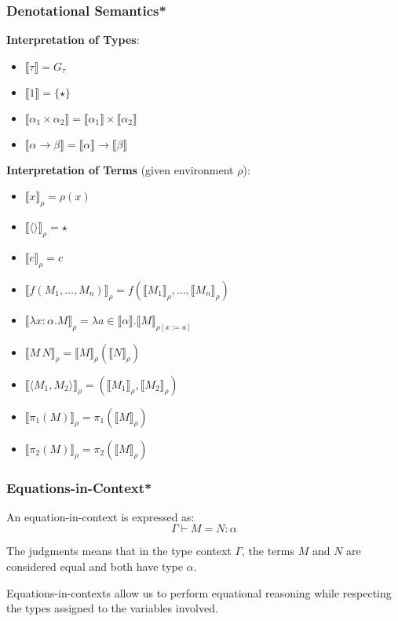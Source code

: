 \documentclass[aspectratio=169]{beamer}
\begin{document}
\begin{frame}
\frametitle{Denotational Semantics*}

\textbf{Interpretation of Types}:

\begin{itemize}
    \item $\llbracket \tau \rrbracket = G_\tau$
    \item $\llbracket 1 \rrbracket = \{\star\}$
    \item $\llbracket \alpha_1 \times \alpha_2 \rrbracket = \llbracket \alpha_1 \rrbracket \times \llbracket \alpha_2 \rrbracket$
    \item $\llbracket \alpha \rightarrow \beta \rrbracket = \llbracket \alpha \rrbracket \rightarrow \llbracket \beta \rrbracket$
\end{itemize}

\textbf{Interpretation of Terms} (given environment $\rho$):
\begin{itemize}
    \item $\llbracket x \rrbracket_\rho = \rho(x)$
    \item $\llbracket \langle \rangle \rrbracket_\rho = \star$
    \item $\llbracket c \rrbracket_\rho = c$
    \item $\llbracket f(M_1, \ldots, M_n) \rrbracket_\rho = f(\llbracket M_1 \rrbracket_\rho, \ldots, \llbracket M_n \rrbracket_\rho)$
    \item $\llbracket \lambda x : \alpha. M \rrbracket_\rho = \lambda a \in \llbracket \alpha \rrbracket. \llbracket M \rrbracket_{\rho[x := a]}$
    \item $\llbracket M \, N \rrbracket_\rho = \llbracket M \rrbracket_\rho (\llbracket N \rrbracket_\rho)$
    \item $\llbracket \langle M_1, M_2 \rangle \rrbracket_\rho = (\llbracket M_1 \rrbracket_\rho, \llbracket M_2 \rrbracket_\rho)$
    \item $\llbracket \pi_1(M) \rrbracket_\rho = \pi_1(\llbracket M \rrbracket_\rho)$
    \item $\llbracket \pi_2(M) \rrbracket_\rho = \pi_2(\llbracket M \rrbracket_\rho)$
\end{itemize}
\end{frame}

\begin{frame}
\frametitle{Equations-in-Context*}

An equation-in-context is expressed as:
\[
\Gamma \vdash M = N : \alpha
\]

The judgments means that in the type context $\Gamma$, the terms $M$ and $N$ are considered equal and both have type $\alpha$.

\medskip

Equations-in-contexts allow us to perform equational reasoning while respecting the types assigned to the variables involved.
\end{frame}
\end{document}

